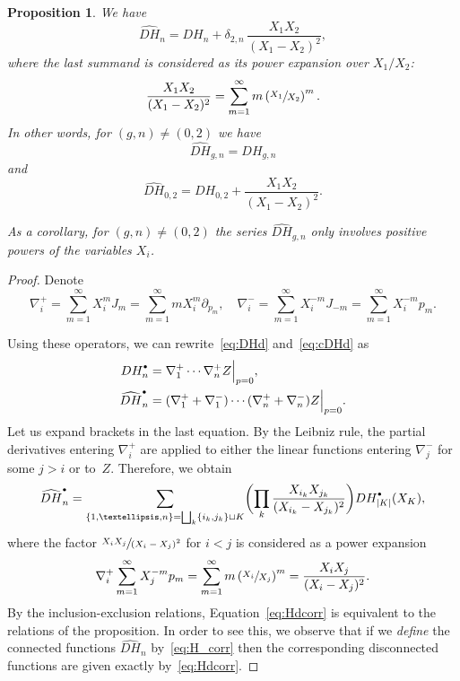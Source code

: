 \documentclass[11pt]{article}
\newcommand{\sbullet}{{\scriptscriptstyle\bullet}}
\newcommand{\csbullet}{{\raisebox{1pt}{$\sbullet$}}}
\theoremstyle{plain}
\newtheorem{proposition}[theorem]{Proposition}
\theoremstyle{definition}
\theoremstyle{remark}
\newcommand{\Hd}{H^\csbullet}
\begin{document}
\begin{proposition}\label{prop:H_corr}
We have
\begin{equation}\label{eq:H_corr}
\widehat{DH}_n=DH_n+\delta_{2,n}\,\frac{X_1X_2}{(X_1-X_2)^2},
\end{equation}
where the last summand is considered as its power expansion over $X_1/X_2$:
\begin{equation*}
\frac{X_1X_2}{(X_1-X_2)^2}=\sum_{m=1}^\infty m\left(\sfrac{X_1}{X_2}\right)^m.
\end{equation*}
In other words, for $(g,n)\ne(0,2)$ we have
\begin{equation*}
\widehat{D H}_{g,n}=DH_{g,n}
\end{equation*}
and
\begin{equation}\label{eq:DH02}
\widehat{D H}_{0,2}=DH_{0,2}+\frac{X_1X_2}{(X_1-X_2)^2}.
\end{equation}

As a corollary, for $(g,n)\ne(0,2)$ the series $\widehat{D H}_{g,n}$ only involves positive powers of the variables $X_i$.
\end{proposition}

\begin{proof}
Denote
\begin{equation*}
\nabla^+_i=\sum_{m=1}^\infty X_i^m J_m=\sum_{m=1}^\infty m X_i^m \partial_{p_m},\quad
\nabla^-_i=\sum_{m=1}^\infty X_i^{-m} J_{-m}=\sum_{m=1}^\infty X_i^{-m} p_m.
\end{equation*}

Using these operators, we can rewrite~\eqref{eq:DHd} and~\eqref{eq:cDHd} as
\begin{align*}
D\Hd_n&=
\nabla_1^+\cdots \nabla_n^+Z\Big|_{p=0},\\
\widehat{DH}^\csbullet_n&=
(\nabla_1^++\nabla_1^-)\cdots (\nabla_n^++\nabla_n^-)Z\Big|_{p=0}.
\end{align*}
Let us expand brackets in the last equation. By the Leibniz rule, the partial derivatives entering $\nabla_i^+$ are applied to either the linear functions entering $\nabla_j^-$ for some $j>i$ or to~$Z$. Therefore, we obtain
\begin{equation}\label{eq:Hdcorr}
\widehat{DH}^\csbullet_n=
\sum_{\{1,\dots,n\}=\bigsqcup_k\{i_k,j_k\}\sqcup K}\biggl(\prod_k\frac{X_{i_k}X_{j_k}}{(X_{i_k}-X_{j_k})^2}\biggr)D\Hd_{|K|}(X_K),
\end{equation}
where the factor $\sfrac{X_iX_j}{(X_i-X_j)^2}$ for $i<j$ is considered as a power expansion
\begin{equation*}
\nabla^+_i\sum_{m=1}^\infty X_j^{-m} p_m
=\sum_{m=1}^\infty m\left(\sfrac{X_i}{X_j}\right)^m
=\frac{X_iX_j}{(X_i-X_j)^2}.
\end{equation*}
By the inclusion-exclusion relations, Equation~\eqref{eq:Hdcorr} is equivalent to the relations of the proposition. In order to see this, we observe that if we \emph{define} the connected functions $\widehat{DH}_n$ by~\eqref{eq:H_corr}
then the corresponding disconnected functions are given exactly by~\eqref{eq:Hdcorr}.
\end{proof}
\end{document}
